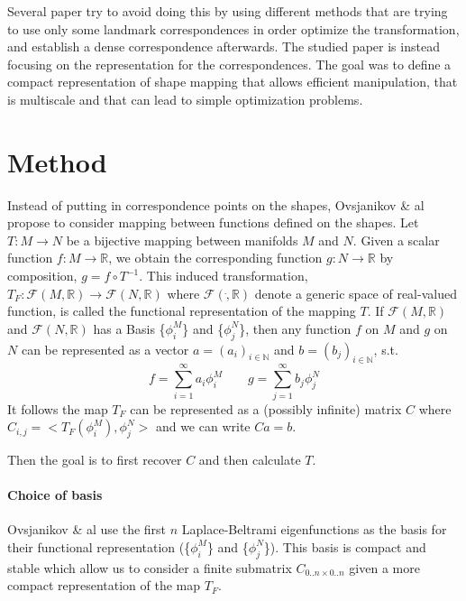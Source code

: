 \documentclass[10pt,twocolumn,letterpaper]{article}
\begin{document}
Several paper try to avoid doing this by using different methods that are trying to use only some landmark correspondences in order optimize the transformation, and establish a dense correspondence afterwards. The studied paper is instead focusing on the representation for the correspondences. The goal was to define a compact representation of shape mapping that allows efficient manipulation, that is multiscale and that can lead to simple optimization problems.


\section{Method} %
Instead of putting in correspondence points on the shapes, Ovsjanikov \& al propose to consider mapping between functions defined on the shapes. 
Let $T : M \rightarrow N$ be a bijective mapping between manifolds $M$ and $N$. Given a scalar function $f: M \rightarrow \mathbb{R}$, we obtain the corresponding function $g : N \rightarrow \mathbb{R}$ by composition, $g=f \circ T^{-1}$. This induced transformation, $T_F : \mathcal{F}(M,\mathbb{R})\rightarrow \mathcal{F}(N,\mathbb{R})$ where $\mathcal{F}(\dot,\mathbb{R})$ denote a generic space of real-valued function, is called the functional representation of the mapping $T$. 
If $\mathcal{F}(M,\mathbb{R})$ and $\mathcal{F}(N,\mathbb{R})$ has a Basis \{$\phi_i^M$\} and \{$\phi_j^N$\}, then any function $f$ on $M$ and $g$ on $N$ can be represented as a vector $a=(a_i)_{i \in \mathbb{N}}$ and $b=(b_j)_{i \in \mathbb{N}}$, s.t.
\begin{equation}
	f = \sum_{i=1}^{\infty}a_i \phi_i^M  \quad \quad g = \sum_{j=1}^{\infty}b_j \phi_j^N
\end{equation}
It follows the map $T_F$ can be represented as a (possibly infinite) matrix $C$ where $C_{i,j}=<T_F(\phi_i^M),\phi_j^N>$ and we can write $Ca=b$.

Then the goal is to first recover $C$ and then calculate $T$.

\paragraph{Choice of basis}
Ovsjanikov \& al  use the first $n$ Laplace-Beltrami eigenfunctions as the basis for their functional representation (\{$\phi_i^M$\} and \{$\phi_j^N$\}). This basis is compact and stable which allow us to consider a finite submatrix $C_{0..n \times 0..n}$ given a more compact representation of the map $T_F$. 
\end{document}
